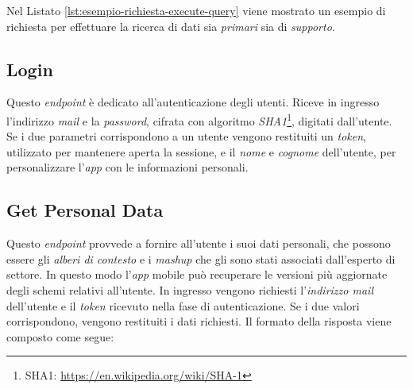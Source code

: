 Nel Listato \ref{lst:esempio-richiesta-execute-query} viene mostrato un esempio di richiesta per effettuare la ricerca di dati sia \emph{primari} sia di \emph{supporto}.

\subsection{Login\label{sec:login-endpoint}}

Questo \emph{endpoint} è dedicato all'autenticazione degli utenti. Riceve in ingresso l'indirizzo \emph{mail} e la \emph{password}, cifrata con algoritmo \emph{SHA1}\footnote{SHA1: \url{https://en.wikipedia.org/wiki/SHA-1}}, digitati dall'utente. Se i due parametri corrispondono a un utente vengono restituiti un \emph{token}, utilizzato per mantenere aperta la sessione, e il \emph{nome} e \emph{cognome} dell'utente, per personalizzare l'\emph{app} con le informazioni personali.

\subsection{Get Personal Data\label{sec:get-personal-data-endpoint}}

Questo \emph{endpoint} provvede a fornire all'utente i suoi dati personali, che possono essere gli \emph{alberi di contesto} e i \emph{mashup} che gli sono stati associati dall'esperto di settore. In questo modo l'\emph{app} mobile può recuperare le versioni più aggiornate degli schemi relativi all'utente. In ingresso vengono richiesti l'\emph{indirizzo mail} dell'utente e il \emph{token} ricevuto nella fase di autenticazione. Se i due valori corrispondono, vengono restituiti i dati richiesti. Il formato della risposta viene composto come segue:

